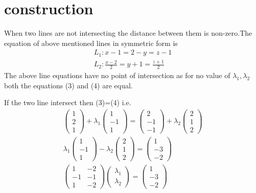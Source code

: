 \documentclass[journal,12pt,twocolumn]{IEEEtran}
\begin{document}
\section{construction}
When two lines are not intersecting the distance between them is non-zero.The equation of above mentioned lines in symmetric form is
\begin{align}
    L_1\colon x-1=2-y=z-1\\
    L_2\colon \frac{x-2}{2}=y+1=\frac{z+1}{2}
\end{align}
The above line equations have no point of intersection as for no value of $\lambda_1,\lambda_2$ both the equations (3) and (4) are equal.\par
If the two line intersect then (3)=(4) i.e.
\begin{align}
    \begin{pmatrix}1\\2\\1\end{pmatrix}+\lambda_1\begin{pmatrix}1\\-1\\1\end{pmatrix}=\begin{pmatrix}2\\-1\\-1\end{pmatrix}+\lambda_2\begin{pmatrix}2\\1\\2\end{pmatrix}\\
    \lambda_1\begin{pmatrix}1\\-1\\1\end{pmatrix}-\lambda_2\begin{pmatrix}2\\1\\2\end{pmatrix}=\begin{pmatrix}1\\-3\\-2\end{pmatrix}\\
    \begin{pmatrix}1 & -2\\-1 & -1\\1 & -2\end{pmatrix}\begin{pmatrix}\lambda_1\\\lambda_2\end{pmatrix}=\begin{pmatrix}1\\-3\\-2\end{pmatrix}\\

\end{align}
\end{document}
